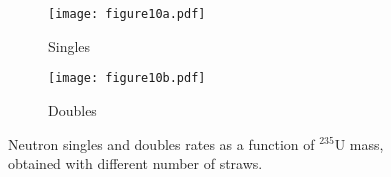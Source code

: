 \documentclass[preprint,final]{elsarticle}
\begin{document}
\begin{figure}[!htbp]
    \captionsetup{font=footnotesize}
    \begin{subfigure}[t]{0.5\linewidth}
        \centering
        \texttt{[image: figure10a.pdf]}
        \caption{Singles}
        \label{fig:NMC_all_single}
    \end{subfigure}\hfil
    \begin{subfigure}[t]{0.5\linewidth}
        \centering
        \texttt{[image: figure10b.pdf]}
        \caption{Doubles}
        \label{fig:NMC_all_double}
    \end{subfigure}
    \caption{Neutron singles and doubles rates as a function of ${}^{235}$U mass, obtained with different number of straws.}
    \label{fig:NMC_all_results}
\end{figure}
\end{document}
